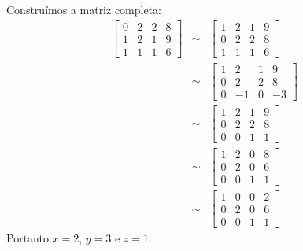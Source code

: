 \begin{sol}
Construímos a matriz completa:
\begin{eqnarray*}\left[
\begin{array}{ccc|c}
0 &2& 2&8\\
1 &2& 1&9\\
1 & 1 &1&6
\end{array}
\right] &\sim&
\left[
\begin{array}{ccc|c}
1 &2& 1&9\\
0 &2& 2&8\\
1 & 1 &1&6
\end{array}
\right] \\ 
&\sim&
\left[
\begin{array}{ccc|c}
1 &2& 1&9\\
0 &2& 2&8\\
0 & -1 &0&-3
\end{array}
\right]\\
&\sim&
\left[
\begin{array}{ccc|c}
1 &2& 1&9\\
0 &2& 2&8\\
0 & 0 &1&1
\end{array}
\right]\\
&\sim&
\left[
\begin{array}{ccc|c}
1 &2& 0&8\\
0 &2& 0&6\\
0 & 0 &1&1
\end{array}
\right]\\
&\sim&
\left[
\begin{array}{ccc|c}
1 &0& 0&2\\
0 &2& 0&6\\
0 & 0 &1&1
\end{array}
\right]
\end{eqnarray*}
Portanto $x=2$, $y=3$ e $z=1$.
\end{sol}

